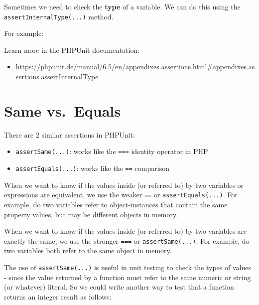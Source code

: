 \documentclass[a4paperpaper,openright]{book}
\newenvironment{Shaded}{}{}
\newcommand{\CommentTok}[1]{\textcolor[rgb]{0.38,0.63,0.69}{\textit{#1}}}
\newcommand{\DecValTok}[1]{\textcolor[rgb]{0.25,0.63,0.44}{#1}}
\newcommand{\KeywordTok}[1]{\textcolor[rgb]{0.00,0.44,0.13}{\textbf{#1}}}
\newcommand{\NormalTok}[1]{#1}
\newcommand{\OtherTok}[1]{\textcolor[rgb]{0.00,0.44,0.13}{#1}}
\newcommand{\StringTok}[1]{\textcolor[rgb]{0.25,0.44,0.63}{#1}}
\providecommand{\tightlist}{%
  \setlength{\itemsep}{0pt}\setlength{\parskip}{0pt}}
\begin{document}
Sometimes we need to check the \textbf{type} of a variable. We can do
this using the \texttt{assertInternalType(...)} method.

For example:

\begin{Shaded}
\end{Shaded}

Learn more in the PHPUnit documentation:

\begin{itemize}
\tightlist
\item
  \url{https://phpunit.de/manual/6.5/en/appendixes.assertions.html\#appendixes.assertions.assertInternalType}
\end{itemize}

\hypertarget{same-vs.-equals}{%
\section{Same vs.~Equals}\label{same-vs.-equals}}

There are 2 similar assertions in PHPUnit:

\begin{itemize}
\tightlist
\item
  \texttt{assertSame(...)}: works like the \texttt{===} identity
  operator in PHP
\item
  \texttt{assertEquals(...)}: works like the \texttt{==} comparison
\end{itemize}

When we want to know if the values inside (or referred to) by two
variables or expressions are equivalent, we use the weaker \texttt{==}
or \texttt{assertEquals(...)}. For example, do two variables refer to
object-instances that contain the same property values, but may be
different objects in memory.

When we want to know if the values inside (or referred to) by two
variables are exactly the same, we use the stronger \texttt{===} or
\texttt{assertSame(...)}. For example, do two variables both refer to
the same object in memory.

The use of \texttt{assertSame(...)} is useful in unit testing to check
the types of values - since the value returned by a function must refer
to the same numeric or string (or whatever) literal. So we could write
another way to test that a function returns an integer result as
follows:
\end{document}
